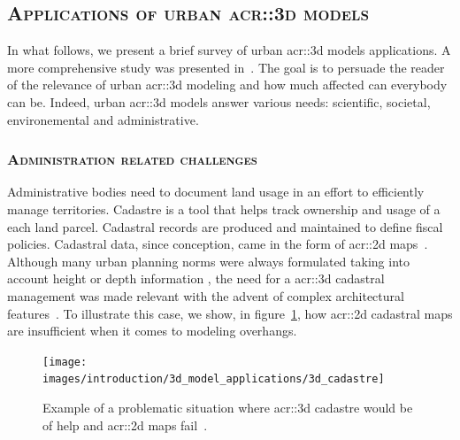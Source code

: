     \subsection{\textsc{Applications of urban \texorpdfstring{\gls*{acr::3d}}{3D} models}}
        \label{subsec::introduction::urban_3d_reconstruction::applications}
        In what follows, we present a brief survey of  urban \gls{acr::3d} models applications.
        A more comprehensive study was presented in~\textcite{ijgi4042842}.
        The goal is to persuade the reader of the relevance of urban \gls{acr::3d} modeling and how much affected can everybody can be.
        Indeed, urban \gls{acr::3d} models answer various needs: scientific, societal, environemental and administrative.

        \subsubsection{\textsc{Administration related challenges}}
            Administrative bodies need to document land usage in an effort to efficiently manage territories.
            Cadastre is a tool that helps track ownership and usage of a each land parcel.
            Cadastral records are produced and maintained to define fiscal policies.
            Cadastral data, since conception, came in the form of \gls{acr::2d} maps~\parencite{billen20033d}.
            Although many urban planning norms were always formulated taking into account height or depth information \parencite{brasebin20183d}, the need for a \gls{acr::3d} cadastral management was made relevant with the advent of complex architectural features~\parencite{ijgi4042842}.
            To illustrate this case, we show, in figure~\ref{fig::3d_cadastre_need_example}, how \gls{acr::2d} cadastral maps are insufficient when it comes to modeling overhangs.\\
            \begin{figure}
                \centering
                \texttt{[image: images/introduction/3d\_model\_applications/3d\_cadastre]}
                \caption{\label{fig::3d_cadastre_need_example} Example of a problematic situation where \gls{acr::3d} cadastre would be of help and \gls{acr::2d} maps fail~\parencite{ijgi4042842}.}
            \end{figure}
